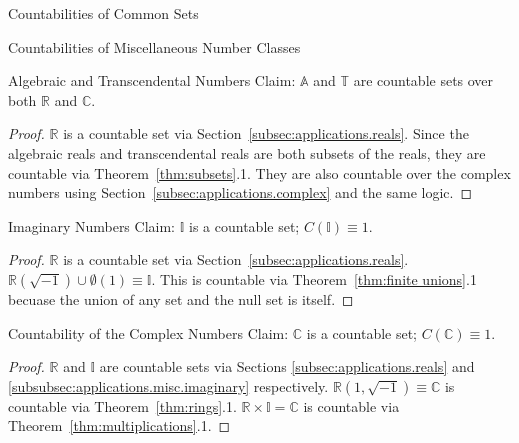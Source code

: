 \documentclass[12pt]{article}
\begin{document}
\begin{section}{Countabilities of Common Sets}
	\begin{subsection}{Countabilities of Miscellaneous Number Classes}
	\label{subsec:applications.miscellaneous}
		\begin{subsubsection}{Algebraic and Transcendental Numbers}
			\label{subsubsec:applications.misc.reals}
			Claim: $\mathbb A$ and $\mathbb T$ are countable sets over both $\mathbb R$ and $\mathbb C$.
			\begin{proof}
				$\mathbb R$ is a countable set via Section~\ref{subsec:applications.reals}.
				Since the algebraic reals and transcendental reals are both subsets of the
				reals, they are countable via Theorem~\ref{thm:subsets}.1. They are also
				countable over the complex numbers using Section~\ref{subsec:applications.complex}
				and the same logic.
			\end{proof}
		\end{subsubsection}

		\begin{subsubsection}{Imaginary Numbers}\label{subsubsec:applications.misc.imaginary}
			Claim: $\mathbb I$ is a countable set; $C(\mathbb I)\equiv1$.
			\begin{proof}
				$\mathbb R$ is a countable set via Section~\ref{subsec:applications.reals}.
				$\mathbb R(\sqrt{-1})\cup\emptyset(1)\equiv\mathbb I$. This is countable via
				Theorem~\ref{thm:finite unions}.1 becuase the union of any set and the null set
				is itself.
			\end{proof}
		\end{subsubsection}
	\end{subsection}

	\begin{subsection}{Countability of the Complex Numbers}\label{subsec:applications.complex}
		Claim: $\mathbb C$ is a countable set; $C(\mathbb C)\equiv1$.
		\begin{proof}
			$\mathbb R$ and $\mathbb I$ are countable sets via Sections \ref{subsec:applications.reals}
			and \ref{subsubsec:applications.misc.imaginary} respectively.
			$\mathbb R(1, \sqrt{-1})\equiv\mathbb C$
			is countable via Theorem~\ref{thm:rings}.1. $\mathbb R\times\mathbb I=\mathbb C$ is
			countable via Theorem~\ref{thm:multiplications}.1.
		\end{proof}
	\end{subsection}
\end{section}
\end{document}
